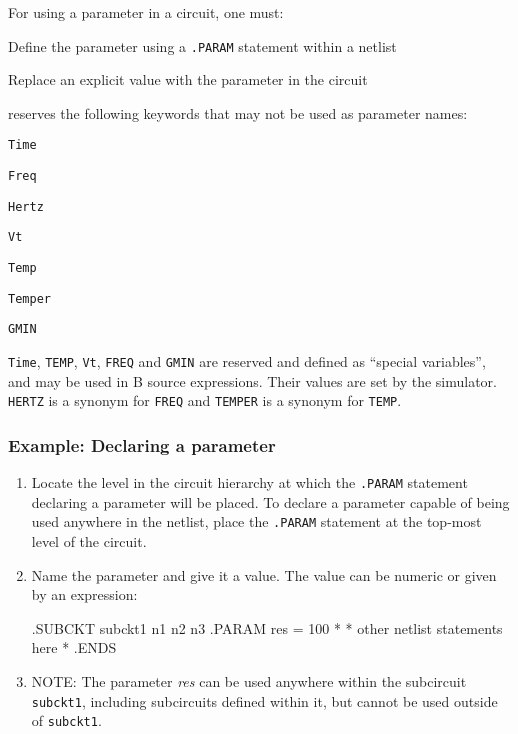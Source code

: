 For using a parameter in a circuit, one must:
\begin{XyceItemize}
\item Define the parameter using a \verb+.PARAM+ statement within a netlist
\item Replace an explicit value with the parameter in the circuit
\end{XyceItemize}
 \Xyce{} reserves the following keywords that may not be used as parameter names:
\begin{XyceItemize}
\item \verb+Time+
\item \verb+Freq+ 
\item \verb+Hertz+
\item \verb+Vt+
\item \verb+Temp+ 
\item \verb+Temper+
\item \verb+GMIN+
\end{XyceItemize}

\texttt{Time}, \texttt{TEMP}, \texttt{Vt}, \texttt{FREQ} and \texttt{GMIN} are
reserved and defined as ``special variables'', and may be used in
B source expressions.   Their values are set by the simulator.  \texttt{HERTZ} is a synonym for \texttt{FREQ} and \texttt{TEMPER} is a synonym for \texttt{TEMP}.

\subsubsection{Example:  Declaring a parameter}
\begin{enumerate}
\item Locate the level in the circuit hierarchy at which the \verb+.PARAM+
  statement declaring a parameter will be placed. To declare a parameter capable of being used anywhere in the netlist, place the \verb+.PARAM+ statement at the top-most level of the circuit.
\item Name the parameter and give it a value. The value can be numeric or given
  by an expression:
  \begin{vquote}
.SUBCKT subckt1 n1 n2 n3
.PARAM res = 100
*
* other netlist statements here
*
.ENDS
\end{vquote}
\item NOTE: The parameter \emph{res} can be used anywhere within the subcircuit
  \texttt{subckt1}, including subcircuits defined within it, but cannot be used outside
  of \texttt{subckt1}.
\end{enumerate}

